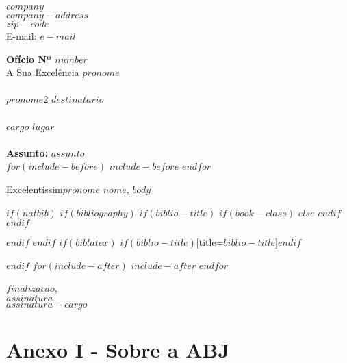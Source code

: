 \documentclass{article}
\begin{document}

\begin{centering}
\textbf{$company$} \\
$company-address$ \\
$zip-code$ \\
E-mail: $e-mail$ \\
\end{centering}

\vspace{4em}
\noindent\textbf{Ofício Nº $number$} \\
\textbf{}
A Sua Excelência $pronome$ \\
\textbf{} \\
$pronome2$ $destinatario$ \\
\textbf{} \\
$cargo$ $lugar$ \\
\textbf{} \\
\textbf{Assunto:} $assunto$ \\

$for(include-before)$
$include-before$
$endfor$

Excelentíssim$pronome$ $nome$,
$body$

$if(natbib)$
$if(bibliography)$
$if(biblio-title)$
$if(book-class)$
\renewcommand\bibname{$biblio-title$}
$else$
\renewcommand\refname{$biblio-title$}
$endif$
$endif$


$endif$
$endif$
$if(biblatex)$
\printbibliography$if(biblio-title)$[title=$biblio-title$]$endif$

$endif$
$for(include-after)$
$include-after$
$endfor$

\vfill
\begin{flushright}
  $finalizacao$, \\
  \vspace{2em}
  $assinatura$ \\
  $assinatura-cargo$
\end{flushright}

\clearpage

\section{Anexo I - Sobre a ABJ}
\end{document}
